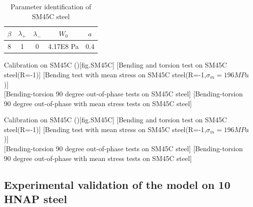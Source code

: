\documentclass[3p,times,number,review]{elsarticle}
\begin{document}
\begin{table}[!h]
\centering
\begin{tabular}{|c|c|c|c|c|}
	\hline
	\textbf{$\beta$} & \textbf{$\lambda_+$} & \textbf{$\lambda_-$} & \textbf{$W_0$} & \textbf{$a$}  \\ \hline
	8    & 1 &0         &4.17E8 Pa  & 0.4    \\ \hline
\end{tabular}
\caption{Parameter identification of SM45C steel}
\label{sm45cpara}
\end{table}

\begin{Figure}[!h]{Calibration on  SM45C (\cite{lee2013out})}[fig.SM45C]
	[Bending and torsion test on SM45C steel(R=-1)]
	[Bending test with mean stress on SM45C steel(R=-1,$\sigma_m=196 MPa$)]
	\\
	[Bending-torsion 90 degree out-of-phase tests on SM45C steel]
	[Bending-torsion 90 degree out-of-phase with mean stress tests on SM45C steel]
\end{Figure}

\begin{Figure}[!h]{Calibration on  SM45C (\cite{lee2013out})}[fig.SM45C]
[Bending and torsion test on SM45C steel(R=-1)]
[Bending test with mean stress on SM45C steel(R=-1,$\sigma_m=196 MPa$)]
\\
[Bending-torsion 90 degree out-of-phase tests on SM45C steel]
[Bending-torsion 90 degree out-of-phase with mean stress tests on SM45C steel]
\end{Figure}


\clearpage
\subsection{Experimental validation of the model on 10 HNAP steel}
\end{document}
